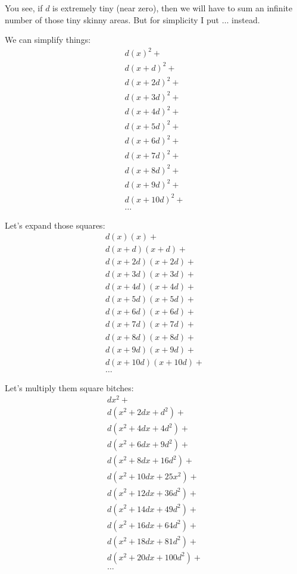 \documentclass{report}
\begin{document}
You see, if $d$ is extremely tiny (near zero), then we will have to sum an
infinite number of those tiny skinny areas. But for simplicity I put $\ldots$
instead.

We can simplify things:
\[\begin{split}
  d(x)^2 + \\
  d(x+d)^2 + \\
  d(x+2d)^2 + \\
  d(x+3d)^2 + \\
  d(x+4d)^2 + \\
  d(x+5d)^2 + \\
  d(x+6d)^2 + \\
  d(x+7d)^2 + \\
  d(x+8d)^2 + \\
  d(x+9d)^2 + \\
  d(x+10d)^2 + \\
  \ldots
\end{split}\]

Let's expand those squares:
\[\begin{split}
  d(x)(x) + \\
  d(x+d)(x+d) + \\
  d(x+2d)(x+2d) + \\
  d(x+3d)(x+3d) + \\
  d(x+4d)(x+4d) + \\
  d(x+5d)(x+5d) + \\
  d(x+6d)(x+6d) + \\
  d(x+7d)(x+7d) + \\
  d(x+8d)(x+8d) + \\
  d(x+9d)(x+9d) + \\
  d(x+10d)(x+10d) + \\
  \ldots
\end{split}\]

Let's multiply them square bitches:
\[\begin{split}
  dx^2 + \\
  d(x^2 + 2dx + d^2) + \\
  d(x^2 + 4dx + 4d^2) + \\
  d(x^2 + 6dx + 9d^2) + \\
  d(x^2 + 8dx + 16d^2) + \\
  d(x^2 + 10dx + 25x^2) + \\
  d(x^2+12dx   +36d^2) + \\
  d(x^2+14dx   +49d^2) + \\
  d(x^2+16dx   +64d^2) + \\
  d(x^2+18dx   +81d^2) + \\
  d(x^2+20dx   +100d^2) + \\
  \ldots
\end{split}\]
\end{document}
